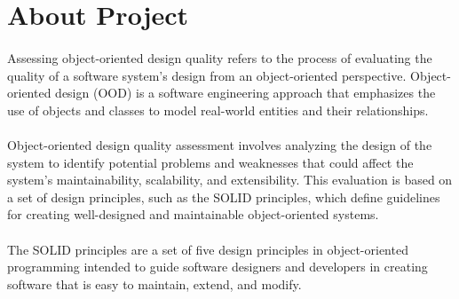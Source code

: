 \section{About Project}

\large

\paragraph{}
Assessing object-oriented design quality refers to the process of evaluating the quality of a software system's design from an object-oriented perspective. Object-oriented design (OOD) is a software engineering approach that emphasizes the use of objects and classes to model real-world entities and their relationships.

\paragraph{}
Object-oriented design quality assessment involves analyzing the design of the system to identify potential problems and weaknesses that could affect the system's maintainability, scalability, and extensibility. This evaluation is based on a set of design principles, such as the SOLID principles, which define guidelines for creating well-designed and maintainable object-oriented systems.

\paragraph{}
The SOLID principles are a set of five design principles in object-oriented programming intended to guide software designers and developers in creating software that is easy to maintain, extend, and modify.

